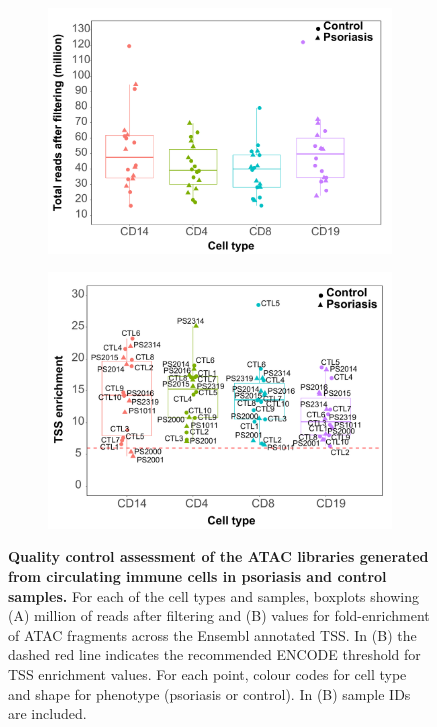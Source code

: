 \begin{figure}[htbp]
\centering
\begin{subfigure}{0.55\textwidth}
\centering
\includegraphics[width=\textwidth]{./Results2/pdfs/ATAC_PS_CTL_final_filtered_reads_boxplot}
\caption{\textbf{}}
\end{subfigure}
\begin{subfigure}{0.55\textwidth}
\centering
\includegraphics[width=\textwidth]{./Results2/pdfs/ATAC_PS_CTL_all_samples_TSS_boxplots_all_labelled}
\caption{\textbf{}}
\end{subfigure}
\caption[Quality control assessment of the ATAC libraries generated from circulating immune cells in psoriasis and control samples.]{\textbf{Quality control assessment of the ATAC libraries generated from circulating immune cells in psoriasis and control samples.} For each of the cell types and samples, boxplots showing (A) million of reads after filtering and (B) values for fold-enrichment of ATAC fragments across the Ensembl annotated TSS. In (B) the dashed red line indicates the recommended ENCODE threshold for TSS enrichment values. For each point, colour codes for cell type and shape for phenotype (psoriasis or control). In (B) sample IDs are included.}
\label{figure:ATAC_PS_CTL_QC}
\end{figure} 



